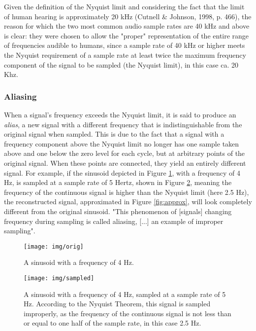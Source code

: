 Given the definition of the Nyquist limit and considering the fact that the limit of human hearing is approximately 20 kHz (Cutnell \& Johnson, 1998, p. 466), the reason for which the two most common audio sample rates are 40 kHz and above is clear: they were chosen to allow the "proper" representation of the entire range of frequencies audible to humans, since a sample rate of 40 kHz or higher meets the Nyquist requirement of a sample rate at least twice the maximum frequency component of the signal to be sampled (the Nyquist limit), in this case ca. 20 Khz.

\subsubsection{Aliasing}

When a signal's frequency exceeds the Nyquist limit, it is said to produce an \emph{alias}, a new signal with a different frequency that is indistinguishable from the original signal when sampled. This is due to the fact that a signal with a frequency component above the Nyquist limit no longer has one sample taken above and one below the zero level for each cycle, but at arbitrary points of the original signal. When these points are connected, they yield an entirely different signal. For example, if the sinusoid depicted in Figure \ref{fig:orig}, with a frequency of 4 Hz, is sampled at a sample rate of 5 Hertz, shown in Figure \ref{fig:sampled}, meaning the frequency of the continuous signal is higher than the Nyquist limit (here 2.5 Hz), the reconstructed signal, approximated in Figure \ref{fig:approx}, will look completely different from the original sinusoid. "This phenomenon of [signals] changing frequency during sampling is called aliasing, [...] an example of improper sampling". 

\begin{figure}[p!]

  \centering

  \texttt{[image: img/orig]}

  \caption{A sinusoid with a frequency of 4 Hz.}

  \label{fig:orig}

\end{figure}

\begin{figure}[p!]

  \centering

  \texttt{[image: img/sampled]}

  \caption{A sinusoid with a frequency of 4 Hz, sampled at a sample rate of 5 Hz. According to the Nyquist Theorem, this signal is sampled improperly, as the frequency of the continuous signal is not less than or equal to one half of the sample rate, in this case 2.5 Hz. }

  \label{fig:sampled}

\end{figure}

